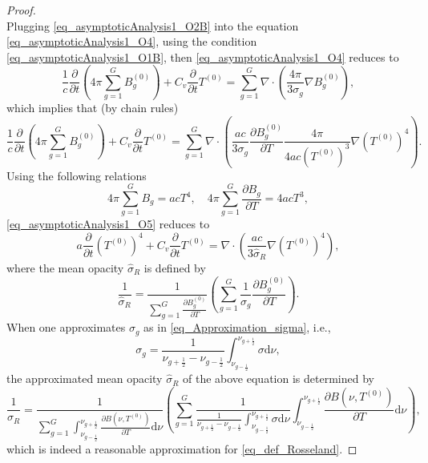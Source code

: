 \documentclass[preprint,12pt]{elsarticle}
\theoremstyle{definition}
\theoremstyle{plain}
\numberwithin{equation}{section}
\numberwithin{algorithm}{section}
\newcounter{eq_count}
\newcommand{\half}{\frac{1}{2}}
\newcommand{\dd}{{\text{d}}}
\newcommand{\pdrv}[2]{\frac{\partial{#1}}{\partial{#2}}}
\begin{document}
\begin{proof}
\begin{equation}
    \end{equation}
    Plugging \eqref{eq_asymptoticAnalysis1_O2B} into the equation \eqref{eq_asymptoticAnalysis1_O4}, using the condition \eqref{eq_asymptoticAnalysis1_O1B}, then \eqref{eq_asymptoticAnalysis1_O4} reduces to
        \begin{equation}
        \frac{1}{c} \frac{\partial }{\partial t} \left( 4 \pi \sum_{g=1}^{G} B_g^{(0)} \right) + C_v \frac{\partial }{\partial t}T^{(0)}  
        = \sum_{g=1}^{G} \nabla \cdot \left( \frac{4 \pi}{3 \sigma_g} \nabla B_g^{(0)} \right),
    \end{equation}
    which implies that (by chain rules)
    \begin{equation}\label{eq_asymptoticAnalysis1_O5}
        \frac{1}{c} \frac{\partial }{\partial t} \left( 4 \pi \sum_{g=1}^{G} B_g^{(0)} \right) + C_v \frac{\partial }{\partial t}T^{(0)}  
        = \sum_{g=1}^{G} \nabla \cdot \left( \frac{ac}{3 \sigma_g} \pdrv{B_g^{(0)}}{T} \frac{4 \pi}{4ac (T^{(0)})^3} \nabla  (T^{(0)})^4 \right).
    \end{equation}
   Using the following relations
    \begin{equation*}
        4 \pi \sum_{g=1}^{G} B_g  = ac T^4, \quad 4 \pi \sum_{g=1}^{G} \pdrv{B_g}{T}   = 4 ac T^3,
    \end{equation*}
    \eqref{eq_asymptoticAnalysis1_O5} reduces to
    \begin{equation}
        a \frac{\partial }{\partial t} (T^{(0)})^4 + C_v \frac{\partial }{\partial t}T^{(0)}  
        =  \nabla \cdot \left( \frac{ac}{3 \hat{\sigma}_R}  \nabla  (T^{(0)})^4 \right),
    \end{equation}
    where the mean opacity $\hat{\sigma}_R$ is defined by 
        \begin{equation*}
        \frac{1}{\hat{\sigma}_R} 
    = \frac{1}{ \sum_{g=1}^{G} \pdrv{B_g^{(0)}}{T} }  \left( \sum_{g=1}^{G} \frac{1}{  \sigma_g }  \pdrv{B_g^{(0)}}{T}   \right) .
    \end{equation*}
    When one approximates $\sigma_g$ as in \eqref{eq_Approximation_sigma}, i.e.,
    \begin{equation*}
        \sigma_g = \frac{1}{\nu_{g+\half}-\nu_{g-\half}} \int_{\nu_{g-\half}}^{\nu_{g+\half}} \sigma  \dd{\nu},
    \end{equation*}
    the approximated mean opacity $\hat{\sigma}_R $ of the above equation is determined by
    \begin{equation}
        \frac{1}{\hat{\sigma}_R} 
      = \frac{1}{ \sum_{g=1}^{G} \int_{\nu_{g-\half}}^{\nu_{g+\half}} \pdrv{B(\nu,T^{(0)})}{T}  \dd{\nu} }  \left( \sum_{g=1}^{G} \frac{1}{\frac{1}{\nu_{g+\half}-\nu_{g-\half}} \int_{\nu_{g-\half}}^{\nu_{g+\half}} \sigma  \dd{\nu} } \int_{\nu_{g-\half}}^{\nu_{g+\half}} \pdrv{B(\nu,T^{(0)})}{T}  \dd{\nu} \right),
    \end{equation}
    which is indeed a reasonable approximation for \eqref{eq_def_Rosseland}.
\end{proof}




\end{document}
